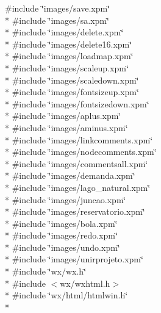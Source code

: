{\ttfamily \#include \char`\"{}images/save.\+xpm\char`\"{}}\\*
{\ttfamily \#include \char`\"{}images/sa.\+xpm\char`\"{}}\\*
{\ttfamily \#include \char`\"{}images/delete.\+xpm\char`\"{}}\\*
{\ttfamily \#include \char`\"{}images/delete16.\+xpm\char`\"{}}\\*
{\ttfamily \#include \char`\"{}images/loadmap.\+xpm\char`\"{}}\\*
{\ttfamily \#include \char`\"{}images/scaleup.\+xpm\char`\"{}}\\*
{\ttfamily \#include \char`\"{}images/scaledown.\+xpm\char`\"{}}\\*
{\ttfamily \#include \char`\"{}images/fontsizeup.\+xpm\char`\"{}}\\*
{\ttfamily \#include \char`\"{}images/fontsizedown.\+xpm\char`\"{}}\\*
{\ttfamily \#include \char`\"{}images/aplus.\+xpm\char`\"{}}\\*
{\ttfamily \#include \char`\"{}images/aminus.\+xpm\char`\"{}}\\*
{\ttfamily \#include \char`\"{}images/linkcomments.\+xpm\char`\"{}}\\*
{\ttfamily \#include \char`\"{}images/nodecomments.\+xpm\char`\"{}}\\*
{\ttfamily \#include \char`\"{}images/commentsall.\+xpm\char`\"{}}\\*
{\ttfamily \#include \char`\"{}images/demanda.\+xpm\char`\"{}}\\*
{\ttfamily \#include \char`\"{}images/lago\+\_\+natural.\+xpm\char`\"{}}\\*
{\ttfamily \#include \char`\"{}images/juncao.\+xpm\char`\"{}}\\*
{\ttfamily \#include \char`\"{}images/reservatorio.\+xpm\char`\"{}}\\*
{\ttfamily \#include \char`\"{}images/bola.\+xpm\char`\"{}}\\*
{\ttfamily \#include \char`\"{}images/redo.\+xpm\char`\"{}}\\*
{\ttfamily \#include \char`\"{}images/undo.\+xpm\char`\"{}}\\*
{\ttfamily \#include \char`\"{}images/unirprojeto.\+xpm\char`\"{}}\\*
{\ttfamily \#include \char`\"{}wx/wx.\+h\char`\"{}}\\*
{\ttfamily \#include $<$wx/wxhtml.\+h$>$}\\*
{\ttfamily \#include \char`\"{}wx/html/htmlwin.\+h\char`\"{}}\\*

